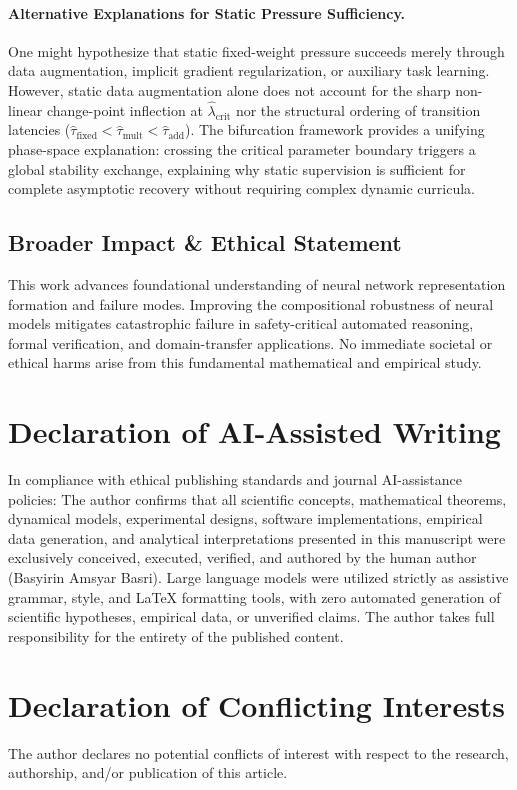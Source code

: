 \documentclass{article}
\theoremstyle{plain}
\theoremstyle{definition}
\begin{document}
\paragraph{Alternative Explanations for Static Pressure Sufficiency.}
One might hypothesize that static fixed-weight pressure succeeds merely through data augmentation, implicit gradient regularization, or auxiliary task learning. However, static data augmentation alone does not account for the sharp non-linear change-point inflection at $\hat{\lambda}_{\text{crit}}$ nor the structural ordering of transition latencies ($\hat{\tau}_{\text{fixed}} < \hat{\tau}_{\text{mult}} < \hat{\tau}_{\text{add}}$). The bifurcation framework provides a unifying phase-space explanation: crossing the critical parameter boundary triggers a global stability exchange, explaining why static supervision is sufficient for complete asymptotic recovery without requiring complex dynamic curricula.
\subsection{Broader Impact \& Ethical Statement}
This work advances foundational understanding of neural network representation formation and failure modes. Improving the compositional robustness of neural models mitigates catastrophic failure in safety-critical automated reasoning, formal verification, and domain-transfer applications. No immediate societal or ethical harms arise from this fundamental mathematical and empirical study.

\section*{Declaration of AI-Assisted Writing}
In compliance with ethical publishing standards and journal AI-assistance policies: The author confirms that all scientific concepts, mathematical theorems, dynamical models, experimental designs, software implementations, empirical data generation, and analytical interpretations presented in this manuscript were exclusively conceived, executed, verified, and authored by the human author (Basyirin Amsyar Basri). Large language models were utilized strictly as assistive grammar, style, and \LaTeX{} formatting tools, with zero automated generation of scientific hypotheses, empirical data, or unverified claims. The author takes full responsibility for the entirety of the published content.

\section*{Declaration of Conflicting Interests}
The author declares no potential conflicts of interest with respect to the research, authorship, and/or publication of this article.
\end{document}

